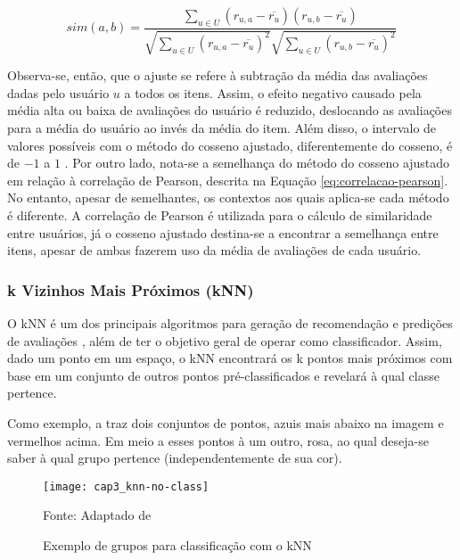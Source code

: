         \begin{equation}
             sim(a, b) = \frac{\sum_{u\in U}(r_{u, a}-\overline{r_u})(r_{u, b}-\overline{r_u})}{\sqrt{\sum_{u\in U}(r_{u, a}-\overline{r_u})^2}\sqrt{\sum_{u\in U}(r_{u, b}-\overline{r_u})^2}} \label{eq:sim-cosseno-ajustado}
        \end{equation}
        
        Observa-se, então, que o ajuste se refere à subtração da média das avaliações dadas pelo usuário $u$ a todos os itens. Assim, o efeito negativo causado pela média alta ou baixa de avaliações do usuário é reduzido, deslocando as avaliações para a média do usuário ao invés da média do item. Além disso, o intervalo de valores possíveis com o método do cosseno ajustado, diferentemente do cosseno, é de $-1$ a $1$ \cite{Jannach2010, Ricci2010}. Por outro lado, nota-se a semelhança do método do cosseno ajustado em relação à correlação de Pearson, descrita na Equação \ref{eq:correlacao-pearson}. No entanto, apesar de semelhantes, os contextos aos quais aplica-se cada método é diferente. A correlação de Pearson é utilizada para o cálculo de similaridade entre usuários, já o cosseno ajustado destina-se a encontrar a semelhança entre itens, apesar de ambas fazerem uso da média de avaliações de cada usuário.
        
        \subsubsection{k Vizinhos Mais Próximos (kNN)}
            
            O kNN é um dos principais algoritmos para geração de recomendação e predições de avaliações \cite{Bobadilla_2013}, além de ter o objetivo geral de operar como classificador. Assim, dado um ponto em um espaço, o kNN encontrará os k pontos mais próximos com base em um conjunto de outros pontos pré-classificados e revelará à qual classe pertence. 
            
            Como exemplo, a  traz dois conjuntos de pontos, azuis mais abaixo na imagem e vermelhos acima. Em meio a esses pontos à um outro, rosa, ao qual deseja-se saber à qual grupo pertence (independentemente de sua cor).             
            
            \begin{figure}[htb]
                \caption{Exemplo de grupos para classificação com o kNN}
                \texttt{[image: cap3\_knn-no-class]}
                \label{fig:cap3_knn-no-class}
                
                {\footnotesize Fonte: Adaptado de }
            \end{figure}
                        
